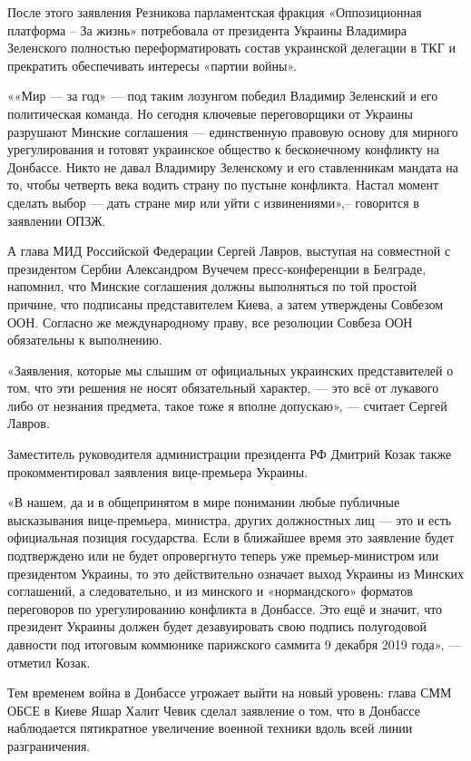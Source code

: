 После этого заявления Резникова парламентская фракция «Оппозиционная платформа
– За жизнь» потребовала от президента Украины Владимира Зеленского полностью
переформатировать состав украинской делегации в ТКГ и прекратить обеспечивать
интересы «партии войны».

««Мир --- за год» --- под таким лозунгом победил Владимир Зеленский и его
политическая команда. Но сегодня ключевые переговорщики от Украины разрушают
Минские соглашения --- единственную правовую основу для мирного урегулирования и
готовят украинское общество к бесконечному конфликту на Донбассе. Никто не
давал Владимиру Зеленскому и его ставленникам мандата на то, чтобы четверть
века водить страну по пустыне конфликта. Настал момент сделать выбор --- дать
стране мир или уйти с извинениями»,– говорится в заявлении ОПЗЖ.

А глава МИД Российской Федерации Сергей Лавров, выступая на совместной с
президентом Сербии Александром Вучечем пресс-конференции в Белграде, напомнил,
что Минские соглашения должны выполняться по той простой причине, что подписаны
представителем Киева, а затем утверждены Совбезом ООН. Согласно же
международному праву, все резолюции Совбеза ООН обязательны к выполнению.

«Заявления, которые мы слышим от официальных украинских представителей о том,
что эти решения не носят обязательный характер, --- это всё от лукавого либо от
незнания предмета, такое тоже я вполне допускаю», --- считает Сергей Лавров.

Заместитель руководителя администрации президента РФ Дмитрий Козак также
прокомментировал заявления вице-премьера Украины.

«В нашем, да и в общепринятом в мире понимании любые публичные высказывания
вице-премьера, министра, других должностных лиц --- это и есть официальная
позиция государства. Если в ближайшее время это заявление будет подтверждено
или не будет опровергнуто теперь уже премьер-министром или президентом Украины,
то это действительно означает выход Украины из Минских соглашений, а
следовательно, и из минского и «нормандского» форматов переговоров по
урегулированию конфликта в Донбассе. Это ещё и значит, что президент Украины
должен будет дезавуировать свою подпись полугодовой давности под итоговым
коммюнике парижского саммита 9 декабря 2019 года», --- отметил Козак.

Тем временем война в Донбассе угрожает выйти на новый уровень: глава СММ ОБСЕ в
Киеве Яшар Халит Чевик сделал заявление о том, что в Донбассе наблюдается
пятикратное увеличение военной техники вдоль всей линии разграничения.

  
